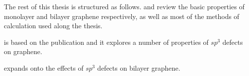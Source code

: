 




%

\bigskip
The rest of this thesis is structured as follows.  and  review the basic properties of monolayer and bilayer graphene respectively, as well as most of the methods of calculation used along the thesis.

 is based on the publication  and it explores a number of properties of $sp^3$ defects on graphene.

 expands onto the effects of $sp^3$ defects on bilayer graphene.


